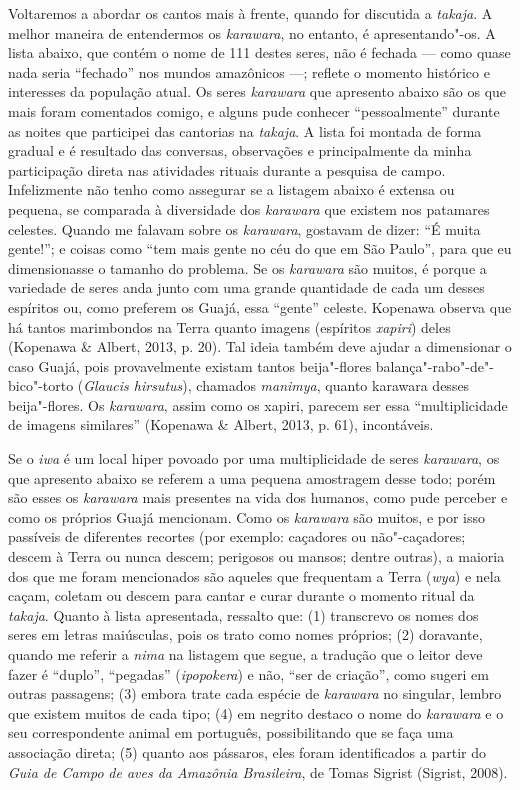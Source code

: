 Voltaremos a abordar os cantos mais à frente, quando for discutida a
\emph{takaja}. A melhor maneira de entendermos os \emph{karawara}, no
entanto, é apresentando"-os. A lista abaixo, que contém o nome de 111
destes seres, não é fechada --- como quase nada seria ``fechado'' nos mundos
amazônicos ---; reflete o momento histórico e interesses da população
atual. Os seres \emph{karawara} que apresento abaixo são os que mais
foram comentados comigo, e alguns pude conhecer ``pessoalmente'' durante
as noites que participei das cantorias na \emph{takaja}. A lista foi
montada de forma gradual e é resultado das conversas, observações e
principalmente da minha participação direta nas atividades rituais
durante a pesquisa de campo. Infelizmente não tenho como assegurar se a
listagem abaixo é extensa ou pequena, se comparada à diversidade dos
\emph{karawara} que existem nos patamares celestes. Quando me falavam
sobre os \emph{karawara}, gostavam de dizer: ``É muita gente!''; e
coisas como ``tem mais gente no céu do que em São Paulo'', para que eu
dimensionasse o tamanho do problema. Se os \emph{karawara} são muitos, é
porque a variedade de seres anda junto com uma grande quantidade de cada
um desses espíritos ou, como preferem os Guajá, essa ``gente'' celeste.
Kopenawa observa que há tantos marimbondos na Terra quanto imagens
(espíritos \emph{xapiri}) deles (Kopenawa \& Albert, 2013, p. 20). Tal
ideia também deve ajudar a dimensionar o caso Guajá, pois provavelmente
existam tantos beija"-flores balança"-rabo"-de"-bico"-torto (\emph{Glaucis
hirsutus}), chamados \emph{manimya}, quanto karawara desses
beija"-flores. Os \emph{karawara}, assim como os xapiri, parecem ser essa
``multiplicidade de imagens similares'' (Kopenawa \& Albert, 2013, p. 61),
incontáveis.

Se o \emph{iwa} é um local hiper povoado por uma multiplicidade de seres
\emph{karawara}, os que apresento abaixo se referem a uma pequena
amostragem desse todo; porém são esses os \emph{karawara} mais presentes
na vida dos humanos, como pude perceber e como os próprios Guajá
mencionam. Como os \emph{karawara} são muitos, e por isso passíveis de
diferentes recortes (por exemplo: caçadores ou não"-caçadores; descem à
Terra ou nunca descem; perigosos ou mansos; dentre outras), a maioria
dos que me foram mencionados são aqueles que frequentam a Terra
(\emph{wya}) e nela caçam, coletam ou descem para cantar e curar durante
o momento ritual da \emph{takaja}. Quanto à lista apresentada, ressalto
que: (1) transcrevo os nomes dos seres em letras maiúsculas, pois os
trato como nomes próprios; (2) doravante, quando me referir a
\emph{nima} na listagem que segue, a tradução que o leitor deve fazer é
``duplo'', ``pegadas'' (\emph{ipopokera}) e não, ``ser de
criação'', como sugeri em outras passagens; (3) embora trate cada espécie
de \emph{karawara} no singular, lembro que existem muitos de cada tipo;
(4) em negrito destaco o nome do \emph{karawara} e o seu correspondente
animal em português, possibilitando que se faça uma associação direta;
(5) quanto aos pássaros, eles foram identificados a partir do \emph{Guia
de Campo} \emph{de aves da Amazônia Brasileira}, de Tomas Sigrist
(Sigrist, 2008).

